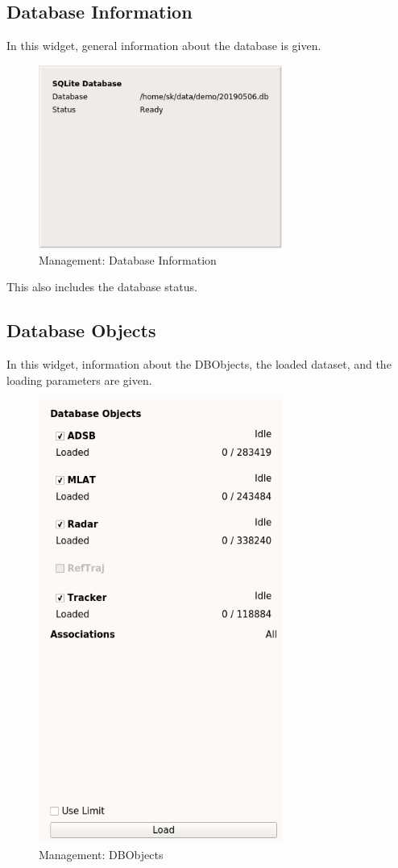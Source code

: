 \subsection{Database Information}

In this widget, general information about the database is given. 

\begin{figure}[H]
  \center
    \includegraphics[width=8cm,frame]{figures/load_database.png}
  \caption{Management: Database Information}
\end{figure}

This also includes the database status.

\subsection{Database Objects}
\label{sec:load_dbos}

In this widget, information about the DBObjects, the loaded dataset, and the loading parameters are given.

\begin{figure}[H]
  \center
    \includegraphics[width=8cm,frame]{figures/load_dbos.png}
  \caption{Management: DBObjects}
\end{figure}

